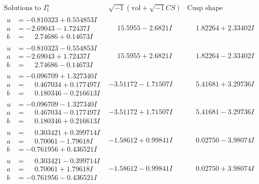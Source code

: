 \documentclass[1p]{elsarticle_modified}
\theoremstyle{definition}
\newcommand{\I}{\sqrt{-1}}
\begin{document}
$$\begin{array}{c|c|c}  
\text{Solutions to }I^u_{1}& \I (\text{vol} + \sqrt{-1}CS) & \text{Cusp shape}\\
 \hline 
\begin{aligned}
u &= -0.810323 + 0.554853 I \\
a &= -2.69043 - 1.72437 I \\
b &= \phantom{-}2.74686 + 0.14673 I\end{aligned}
 & \phantom{-}15.5955 - 2.6821 I & \phantom{-}1.82264 + 2.33402 I \\ \hline\begin{aligned}
u &= -0.810323 - 0.554853 I \\
a &= -2.69043 + 1.72437 I \\
b &= \phantom{-}2.74686 - 0.14673 I\end{aligned}
 & \phantom{-}15.5955 + 2.6821 I & \phantom{-}1.82264 - 2.33402 I \\ \hline\begin{aligned}
u &= -0.096709 + 1.327340 I \\
a &= \phantom{-}0.467034 + 0.177497 I \\
b &= \phantom{-}0.180346 - 0.216613 I\end{aligned}
 & -3.51172 - 1.71507 I & \phantom{-}5.41681 + 3.29736 I \\ \hline\begin{aligned}
u &= -0.096709 - 1.327340 I \\
a &= \phantom{-}0.467034 - 0.177497 I \\
b &= \phantom{-}0.180346 + 0.216613 I\end{aligned}
 & -3.51172 + 1.71507 I & \phantom{-}5.41681 - 3.29736 I \\ \hline\begin{aligned}
u &= \phantom{-}0.303421 + 0.399714 I \\
a &= \phantom{-}0.70061 - 1.79618 I \\
b &= -0.761956 + 0.436521 I\end{aligned}
 & -1.58612 + 0.99841 I & \phantom{-}0.02750 - 3.98074 I \\ \hline\begin{aligned}
u &= \phantom{-}0.303421 - 0.399714 I \\
a &= \phantom{-}0.70061 + 1.79618 I \\
b &= -0.761956 - 0.436521 I\end{aligned}
 & -1.58612 - 0.99841 I & \phantom{-}0.02750 + 3.98074 I \\ \hline\begin{aligned}

\end{aligned}
\end{array}$$
\end{document}
